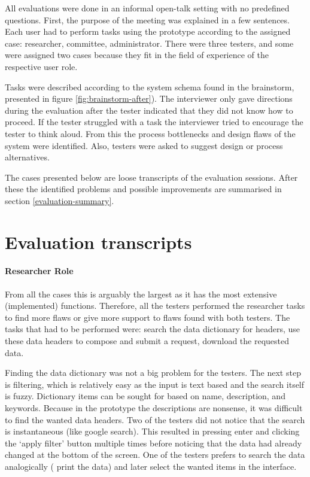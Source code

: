 All evaluations were done in an informal open-talk setting with no predefined questions.
First, the purpose of the meeting was explained in a few sentences.
Each user had to perform tasks using the prototype according to the assigned case: researcher, committee, administrator.
There were three testers, and some were assigned two cases because they fit in the field of experience of the respective user role.

Tasks were described according to the system schema found in the brainstorm, presented in figure \ref{fig:brainstorm-after}).
The interviewer only gave directions during the evaluation after the tester indicated that they did not know how to proceed.
If the tester struggled with a task the interviewer tried to encourage the tester to think aloud.
From this the process bottlenecks and design flaws of the system were identified.
Also, testers were asked to suggest design or process alternatives.

The  cases presented below are loose transcripts of the evaluation sessions.
After these the identified problems and possible improvements are summarised in section \ref{evaluation-summary}.

\section{Evaluation transcripts}

\paragraph{Researcher Role}
From all the cases this is arguably the largest as it has the most extensive (implemented) functions.
Therefore, all the testers performed the researcher tasks to find more flaws or give more support to flaws found with both testers.
The tasks that had to be performed were: search the data dictionary for headers, use these data headers to compose and submit a request, download the requested data.

Finding the data dictionary was not a big problem for the testers.
The next step is filtering, which is relatively easy as the input is text based and the search itself is fuzzy.
Dictionary items can be sought for based on name, description, and keywords.
Because in the prototype the descriptions are nonsense, it was difficult to find the wanted data headers.
Two of the testers did not notice that the search is instantaneous (like google search).
This resulted in pressing enter and clicking the `apply filter' button multiple times before noticing that the data had already changed at the bottom of the screen.
One of the testers prefers to search the data analogically (\ie{} print the data) and later select the wanted items in the interface.


